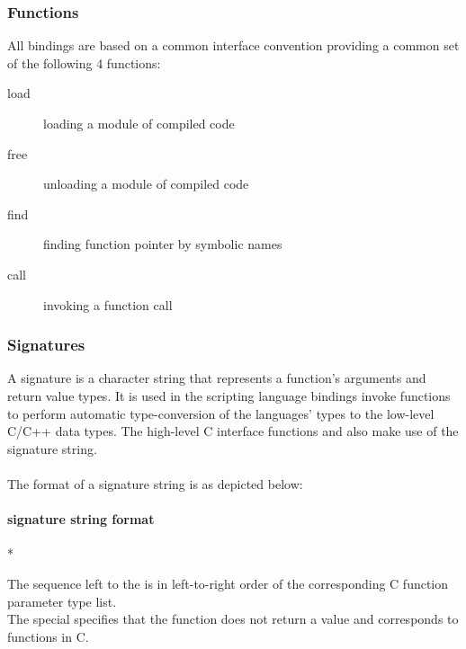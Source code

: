 \subsubsection{Functions}

All bindings are based on a common interface convention providing a common set
of the following 4 functions:
\begin{description}
\item [load] loading a module of compiled code
\item [free] unloading a module of compiled code
\item [find] finding function pointer by symbolic names
\item [call] invoking a function call
\end{description}

\pagebreak

\subsubsection{Signatures}

A signature is a character string that represents a function's arguments and
return value types. It is used in the scripting language bindings invoke
functions to perform automatic type-conversion of the languages' types to the
low-level C/C++ data types.
The high-level C interface functions  and 
also make use of the  signature string.\\
\\
The format of a  signature string is as depicted below:


\paragraph{ signature string format}

\begin{center}
* \sigchar{)}  \\
\end{center}

The  sequence left to the
\sigchar{)} is in left-to-right order of the corresponding C function
parameter type list.\\
The special   specifies
that the function does not return a value and corresponds to 
functions in C.

